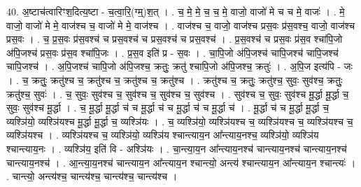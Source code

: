 \documentclass[17pt]{extarticle}
\begin{document}
40. अ॒ष्टाच॑त्वारिꣳश॒दित्य॒ष्टा - च॒त्वा॒रि॒(ग्म्॒)श॒त् । . च॒ मे॒ मे॒ च॒ च॒ मे॒ वाजो॒ वाजो॑ मे च च मे॒ वाजः॑ । . मे॒ वाजो॒ वाजो॑ मे मे॒ वाज॑श्च च॒ वाजो॑ मे मे॒ वाज॑श्च । . वाज॑श्च च॒ वाजो॒ वाज॑श्च प्रस॒वः प्र॑स॒वश्च॒ वाजो॒ वाज॑श्च प्रस॒वः । . च॒ प्र॒स॒वः प्र॑स॒वश्च॑ च प्रस॒वश्च॑ च प्रस॒वश्च॑ च प्रस॒वश्च॑ । . प्र॒स॒वश्च॑ च प्रस॒वः प्र॑स॒व श्चा॑पि॒जो अ॑पि॒जश्च॑ प्रस॒वः प्र॑स॒व श्चा॑पि॒जः । . प्र॒स॒व इति॑ प्र - स॒वः । . चा॒पि॒जो अ॑पि॒जश्च॑ चापि॒जश्च॑ चापि॒जश्च॑ चापि॒जश्च॑ । . अ॒पि॒जश्च॑ चापि॒जो अ॑पि॒जश्च॒ क्रतुः॒ क्रतु॑ श्चापि॒जो अ॑पि॒जश्च॒ क्रतुः॑ । . अ॒पि॒ज इत्य॑पि - जः । . च॒ क्रतुः॒ क्रतु॑श्च च॒ क्रतु॑श्च च॒ क्रतु॑श्च च॒ क्रतु॑श्च । . क्रतु॑श्च च॒ क्रतुः॒ क्रतु॑श्च॒ सुवः॒ सुव॑श्च॒ क्रतुः॒ क्रतु॑श्च॒ सुवः॑ । . च॒ सुवः॒ सुव॑श्च च॒ सुव॑श्च च॒ सुव॑श्च च॒ सुव॑श्च । . सुव॑श्च च॒ सुवः॒ सुव॑श्च मू॒र्द्धा मू॒र्द्धा च॒ सुवः॒ सुव॑श्च मू॒र्द्धा । . च॒ मू॒र्द्धा मू॒र्द्धा च॑ च मू॒र्द्धा च॑ च मू॒र्द्धा च॑ च मू॒र्द्धा च॑ । . मू॒र्द्धा च॑ च मू॒र्द्धा मू॒र्द्धा च॒ व्यश्ञि॑यो॒ व्यश्ञि॑यश्च मू॒र्द्धा मू॒र्द्धा च॒ व्यश्ञि॑यः । . च॒ व्यश्ञि॑यो॒ व्यश्ञि॑यश्च च॒ व्यश्ञि॑यश्च च॒ व्यश्ञि॑यश्च च॒ व्यश्ञि॑यश्च । . व्यश्ञि॑यश्च च॒ व्यश्ञि॑यो॒ व्यश्ञि॑य श्चान्त्याय॒न आ᳚न्त्याय॒नश्च॒ व्यश्ञि॑यो॒ व्यश्ञि॑य श्चान्त्याय॒नः । . व्यश्ञि॑य॒ इति॑ वि - अश्ञि॑यः । . चा॒न्त्या॒य॒न आ᳚न्त्याय॒नश्च॑ चान्त्याय॒नश्च॑ चान्त्याय॒नश्च॑ चान्त्याय॒नश्च॑ । . आ॒न्त्या॒य॒नश्च॑ चान्त्याय॒न आ᳚न्त्याय॒न श्चान्त्यो॒ अन्त्य॑ श्चान्त्याय॒न आ᳚न्त्याय॒न श्चान्त्यः॑ । . चान्त्यो॒ अन्त्य॑श्च॒ चान्त्य॑श्च॒ चान्त्य॑श्च॒ चान्त्य॑श्च । \newline
\end{document}
